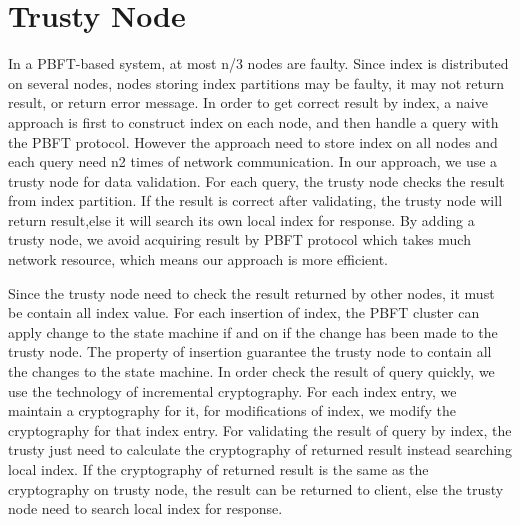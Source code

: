\section{Trusty Node}
\vspace{-0.2cm}
In a PBFT-based system, at most n/3 nodes are faulty. Since index is distributed on several nodes, nodes storing
index partitions may be faulty, it may not return result, or return error message. In order to get correct result by index,
a naive approach is first to construct index on each node, and then handle a query with the PBFT protocol. However the
approach need to store index on all nodes and each query need n2 times of network communication. In our approach, we use a trusty node for data validation. For each query, the trusty node checks the result from index partition. If the result is correct after validating, the trusty node will return result,else it will search its own local index for response. By adding a trusty node, we avoid acquiring result by PBFT protocol which takes much network resource, which means our approach is more efficient.

Since the trusty node need to check the result returned by other nodes, it must be contain all index value. For each insertion of index, the PBFT cluster can apply change to the state machine if and on if the change has been made to the
trusty node. The property of insertion guarantee the trusty node to contain all the changes to the state machine. In
order check the result of query quickly, we use the technology of incremental cryptography. For each index entry, we
maintain a cryptography for it, for modifications of index, we modify the cryptography for that index entry. For validating the result of query by index, the trusty just need to calculate the cryptography of returned result instead searching local index. If the cryptography of returned result is the same as the cryptography on trusty node, the result can be
returned to client, else the trusty node need to search local index for response.


